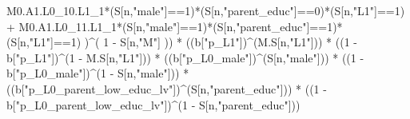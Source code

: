 \documentclass[
]{book}
\newenvironment{Shaded}{\begin{snugshade}}{\end{snugshade}}
\newcommand{\DecValTok}[1]{\textcolor[rgb]{0.00,0.00,0.81}{#1}}
\newcommand{\NormalTok}[1]{#1}
\newcommand{\SpecialCharTok}[1]{\textcolor[rgb]{0.00,0.00,0.00}{#1}}
\newcommand{\StringTok}[1]{\textcolor[rgb]{0.31,0.60,0.02}{#1}}
\begin{document}
\begin{Shaded}
\begin{Highlighting}[]
\NormalTok{          M0.A1.L0\_10.L1\_1}\SpecialCharTok{*}\NormalTok{(S[n,}\StringTok{"male"}\NormalTok{]}\SpecialCharTok{==}\DecValTok{1}\NormalTok{)}\SpecialCharTok{*}\NormalTok{(S[n,}\StringTok{"parent\_educ"}\NormalTok{]}\SpecialCharTok{==}\DecValTok{0}\NormalTok{)}\SpecialCharTok{*}\NormalTok{(S[n,}\StringTok{"L1"}\NormalTok{]}\SpecialCharTok{==}\DecValTok{1}\NormalTok{) }\SpecialCharTok{+}
\NormalTok{          M0.A1.L0\_11.L1\_1}\SpecialCharTok{*}\NormalTok{(S[n,}\StringTok{"male"}\NormalTok{]}\SpecialCharTok{==}\DecValTok{1}\NormalTok{)}\SpecialCharTok{*}\NormalTok{(S[n,}\StringTok{"parent\_educ"}\NormalTok{]}\SpecialCharTok{==}\DecValTok{1}\NormalTok{)}\SpecialCharTok{*}
\NormalTok{          (S[n,}\StringTok{"L1"}\NormalTok{]}\SpecialCharTok{==}\DecValTok{1}\NormalTok{) )}\SpecialCharTok{\^{}}\NormalTok{( }\DecValTok{1} \SpecialCharTok{{-}}\NormalTok{ S[n,}\StringTok{"M"}\NormalTok{] )) }\SpecialCharTok{*}
\NormalTok{      ((b[}\StringTok{"p\_L1"}\NormalTok{])}\SpecialCharTok{\^{}}\NormalTok{(M.S[n,}\StringTok{"L1"}\NormalTok{])) }\SpecialCharTok{*}
\NormalTok{      ((}\DecValTok{1} \SpecialCharTok{{-}}\NormalTok{ b[}\StringTok{"p\_L1"}\NormalTok{])}\SpecialCharTok{\^{}}\NormalTok{(}\DecValTok{1} \SpecialCharTok{{-}}\NormalTok{ M.S[n,}\StringTok{"L1"}\NormalTok{])) }\SpecialCharTok{*}
\NormalTok{      ((b[}\StringTok{"p\_L0\_male"}\NormalTok{])}\SpecialCharTok{\^{}}\NormalTok{(S[n,}\StringTok{"male"}\NormalTok{])) }\SpecialCharTok{*} 
\NormalTok{      ((}\DecValTok{1} \SpecialCharTok{{-}}\NormalTok{ b[}\StringTok{"p\_L0\_male"}\NormalTok{])}\SpecialCharTok{\^{}}\NormalTok{(}\DecValTok{1} \SpecialCharTok{{-}}\NormalTok{ S[n,}\StringTok{"male"}\NormalTok{])) }\SpecialCharTok{*} 
\NormalTok{      ((b[}\StringTok{"p\_L0\_parent\_low\_educ\_lv"}\NormalTok{])}\SpecialCharTok{\^{}}\NormalTok{(S[n,}\StringTok{"parent\_educ"}\NormalTok{])) }\SpecialCharTok{*}
\NormalTok{      ((}\DecValTok{1} \SpecialCharTok{{-}}\NormalTok{ b[}\StringTok{"p\_L0\_parent\_low\_educ\_lv"}\NormalTok{])}\SpecialCharTok{\^{}}\NormalTok{(}\DecValTok{1} \SpecialCharTok{{-}}\NormalTok{ S[n,}\StringTok{"parent\_educ"}\NormalTok{])) }
    

\end{Highlighting}
\end{Shaded}
\end{document}
